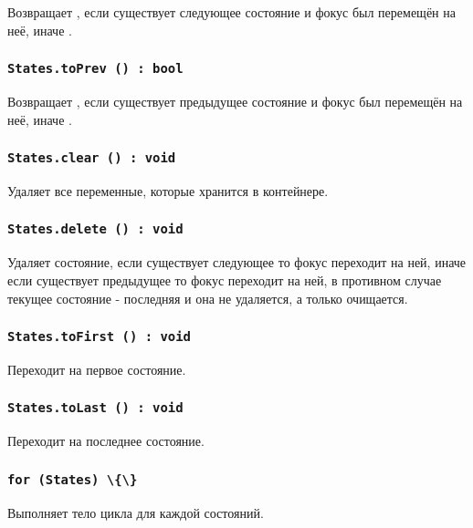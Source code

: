 Возвращает \true, если существует следующее состояние и фокус был перемещён на неё, иначе \false.

\subsubsection{\lstinline|States.toPrev () : bool|}

Возвращает \true, если существует предыдущее состояние и фокус был перемещён на неё, иначе \false.

\subsubsection{\lstinline|States.clear () : void|}

Удаляет все переменные, которые хранится в контейнере.

\subsubsection{\lstinline|States.delete () : void|}

Удаляет состояние, если существует следующее то фокус переходит на ней, иначе если существует предыдущее то фокус переходит на ней, в противном случае текущее состояние - последняя и она не удаляется, а только очищается.

\subsubsection{\lstinline|States.toFirst () : void|}

Переходит на первое состояние.

\subsubsection{\lstinline|States.toLast () : void|}

Переходит на последнее состояние.

\subsubsection{\lstinline|for (States) \{\}|}

Выполняет тело цикла для каждой состояний.

